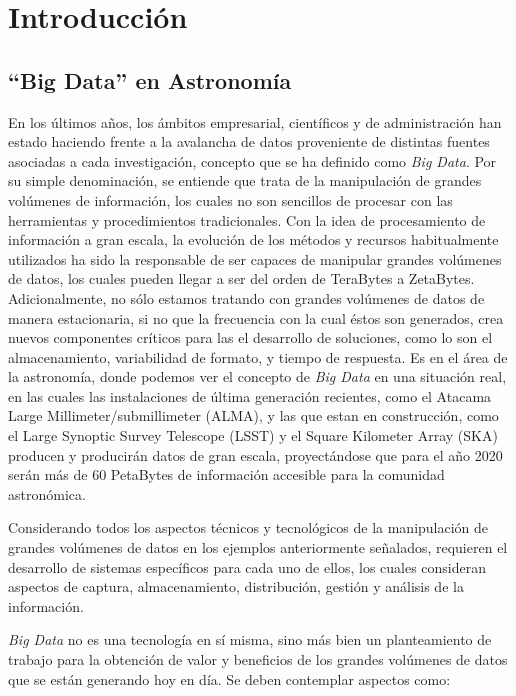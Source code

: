 \section{Introducción}

\subsection{``Big Data'' en Astronomía}

En los últimos años, los ámbitos empresarial, científicos y de administración
han estado haciendo frente a la avalancha de datos proveniente de distintas
fuentes asociadas a cada investigación, concepto que se ha definido como
\emph{Big Data}.
Por su simple denominación, se entiende que trata de la manipulación de grandes
volúmenes de información, los cuales no son sencillos de procesar con las herramientas
y procedimientos tradicionales.
Con la idea de procesamiento de información a gran escala,
la evolución de los métodos y recursos habitualmente utilizados
ha sido la responsable de ser capaces de manipular grandes volúmenes de datos,
los cuales pueden llegar a ser del orden de TeraBytes a ZetaBytes.
Adicionalmente, no sólo estamos tratando con grandes volúmenes de datos
de manera estacionaria, si no que la frecuencia con la cual éstos son generados,
crea nuevos componentes críticos para las el desarrollo de soluciones,
como lo son el almacenamiento, variabilidad de formato, y tiempo de respuesta.
Es en el área de la astronomía, donde podemos ver el concepto de \emph{Big Data}
en una situación real, en las cuales las instalaciones de última generación
recientes, como el Atacama Large Millimeter/submillimeter (ALMA),
y las que estan en construcción, como el Large Synoptic Survey Telescope (LSST) y el
Square Kilometer Array (SKA)
producen y producirán datos de gran escala, proyectándose que para el año 2020
serán más de 60 PetaBytes de información accesible para la comunidad astronómica.

Considerando todos los aspectos técnicos y tecnológicos de la manipulación
de grandes volúmenes de datos en los ejemplos anteriormente señalados, requieren
el desarrollo de sistemas específicos para cada uno de ellos,
los cuales consideran aspectos de captura, almacenamiento, distribución, gestión
y análisis de la información.

\emph{Big Data} no es una tecnología en sí misma, sino más bien un planteamiento de
trabajo para la obtención de valor y beneficios de los grandes volúmenes de
datos que se están generando hoy en día. Se deben contemplar aspectos como:

